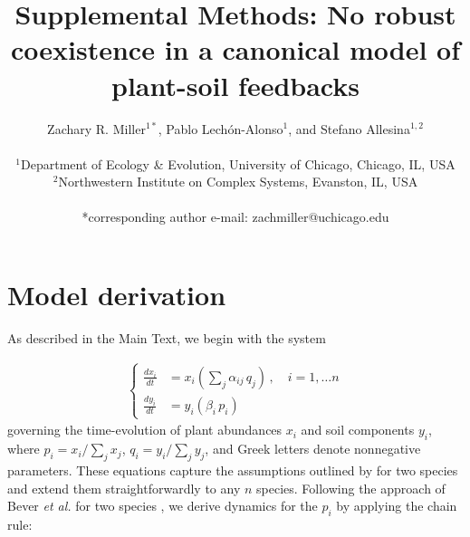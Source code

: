 \documentclass[11pt]{article}
\title{Supplemental Methods: No robust coexistence in a canonical model of plant-soil feedbacks}
\date{}
\author{Zachary R. Miller$^{1*}$, Pablo Lech\'{o}n-Alonso$^{1}$, and Stefano Allesina$^{1,2}$ \\
	\\
	\normalsize{$^{1}$Department of Ecology \& Evolution, University of Chicago, Chicago, IL, USA}\\
	\normalsize{$^{2}$Northwestern Institute on Complex Systems, Evanston, IL, USA}\\
	\\
	\normalsize{*corresponding author e-mail: zachmiller@uchicago.edu}\\
}
\begin{document}
\maketitle
{}
\linenumbers

\section{Model derivation}

As described in the Main Text, we begin with the system

\begin{align}
\begin{cases}
\frac{dx_i}{dt} &= x_i \left(\sum_{j} \alpha_{ij} \, q_j \right) \, , \quad  i = 1, \dots n \\
\frac{dy_i}{dt} &= y_i \left( \beta_i \, p_i \right)
\end{cases}
\end{align}
governing the time-evolution of plant abundances $x_i$ and soil components $y_i$, where $p_i = x_i / \sum_j x_j$, $q_i = y_i / \sum_j y_j$, and Greek letters denote nonnegative parameters. These equations capture the assumptions outlined by \citet{bever1997incorporating} for two species and extend them straightforwardly to any $n$ species. Following the approach of Bever \textit{et al.} for two species \citep[and consistent with other generalizations of this model, e.g.,][]{kulmatiski2008plant,eppinga2018frequency}, we derive dynamics for the $p_i$ by applying the chain rule:
\end{document}
